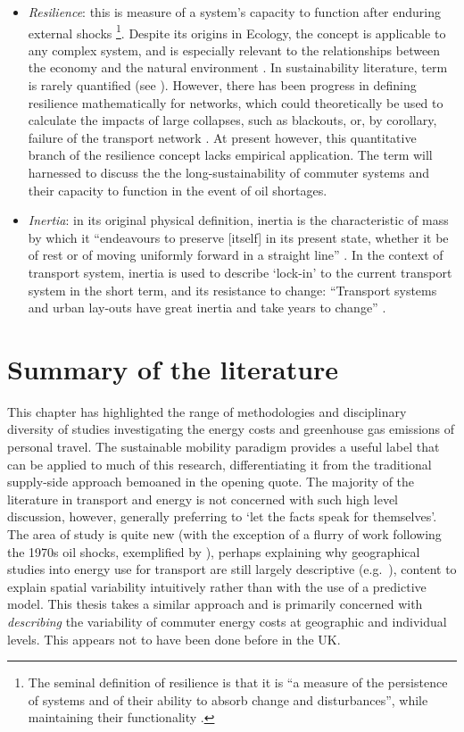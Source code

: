 \begin{itemize}
\item \emph{Resilience}: this is measure of a system's capacity to function
after enduring external shocks \citep{Holling1973}\footnote{The seminal
definition of resilience is that it is ``a measure of the persistence
of systems and of their ability to absorb change and disturbances'', while
maintaining their functionality \citep[p. 14]{Holling1973}.
}.
Despite its origins in Ecology, the concept is applicable to any complex
system, and is especially relevant to the relationships between the
economy and the natural environment \citep{Holling2001}. In sustainability
literature, term is rarely quantified (see \citealp{Bridge2010}). However,
there has been progress in defining resilience mathematically for 
networks, which could theoretically be used to calculate the impacts of
large collapses, such as blackouts, or, by corollary, failure of the transport
network \citep{Barthelemy2011}. At present however, this quantitative branch of
the resilience concept lacks empirical application. The term will harnessed to
discuss the the long-sustainability of commuter systems and their capacity to
function in the event of oil shortages.

\item \emph{Inertia}: in its original physical definition, inertia is the
characteristic of mass by which it ``endeavours to preserve [itself] in its
present state, whether it be of rest or of moving uniformly forward in a
straight line'' \citep[p. 73]{Newton1848}. In the context of transport system,
inertia is used to describe `lock-in' to the current
transport system in the short term, and its resistance to change:
``Transport systems and urban lay-outs have great inertia and take years to
change'' \citep[p. 365]{Chapman2007}.
\end{itemize}

\section{Summary of the literature} \label{sc2sum}
This chapter has highlighted the range of methodologies and disciplinary
diversity of studies investigating the energy costs and
greenhouse gas emissions of personal travel.
The sustainable mobility paradigm provides a useful label that can be applied to
much of this research, differentiating it from the traditional supply-side
approach bemoaned in the opening quote. The majority of the literature in
transport and energy is not concerned with such high level discussion, however,
generally preferring to `let the facts speak for themselves'. The area of
study is quite new (with the exception of a flurry of work following the
1970s oil shocks, exemplified by \citet{Fels1975}), perhaps explaining why
geographical studies into energy use for transport are still
largely descriptive (e.g.~\citealp{Marique2013, Boussauw2009}), content to
explain spatial variability intuitively rather than with the use of a
predictive model. This thesis takes a similar approach and is primarily
concerned with \emph{describing} the variability of commuter energy costs
at geographic and individual levels. This appears not to have been done
before in the UK.

